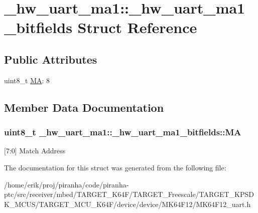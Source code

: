 \hypertarget{struct__hw__uart__ma1_1_1__hw__uart__ma1__bitfields}{}\section{\+\_\+hw\+\_\+uart\+\_\+ma1\+:\+:\+\_\+hw\+\_\+uart\+\_\+ma1\+\_\+bitfields Struct Reference}
\label{struct__hw__uart__ma1_1_1__hw__uart__ma1__bitfields}
\subsection*{Public Attributes}
\begin{DoxyCompactItemize}
\item 
uint8\+\_\+t \hyperlink{struct__hw__uart__ma1_1_1__hw__uart__ma1__bitfields_aff01778cf58a8e6721759ef502499cfb}{MA}\+: 8
\end{DoxyCompactItemize}


\subsection{Member Data Documentation}
\subsubsection[{\texorpdfstring{MA}{MA}}]{\setlength{\rightskip}{0pt plus 5cm}uint8\+\_\+t \+\_\+hw\+\_\+uart\+\_\+ma1\+::\+\_\+hw\+\_\+uart\+\_\+ma1\+\_\+bitfields\+::\+MA}\hypertarget{struct__hw__uart__ma1_1_1__hw__uart__ma1__bitfields_aff01778cf58a8e6721759ef502499cfb}{}\label{struct__hw__uart__ma1_1_1__hw__uart__ma1__bitfields_aff01778cf58a8e6721759ef502499cfb}
\mbox{[}7\+:0\mbox{]} Match Address 

The documentation for this struct was generated from the following file\+:\begin{DoxyCompactItemize}
\item 
/home/erik/proj/piranha/code/piranha-\/ptc/src/receiver/mbed/\+T\+A\+R\+G\+E\+T\+\_\+\+K64\+F/\+T\+A\+R\+G\+E\+T\+\_\+\+Freescale/\+T\+A\+R\+G\+E\+T\+\_\+\+K\+P\+S\+D\+K\+\_\+\+M\+C\+U\+S/\+T\+A\+R\+G\+E\+T\+\_\+\+M\+C\+U\+\_\+\+K64\+F/device/device/\+M\+K64\+F12/M\+K64\+F12\+\_\+uart.\+h\end{DoxyCompactItemize}
